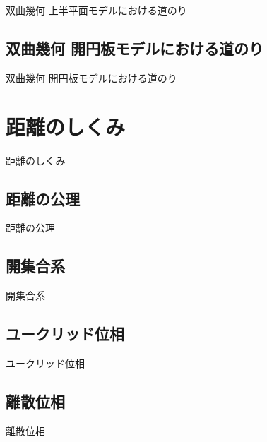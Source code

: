 双曲幾何 上半平面モデルにおける道のり

\newpage


\subsection{双曲幾何 開円板モデルにおける道のり}

双曲幾何 開円板モデルにおける道のり

\newpage


\section{距離のしくみ}

距離のしくみ

\newpage


\subsection{距離の公理}

距離の公理

\newpage


\subsection{開集合系}

開集合系

\newpage


\subsection{ユークリッド位相}

ユークリッド位相

\newpage


\subsection{離散位相}

離散位相

